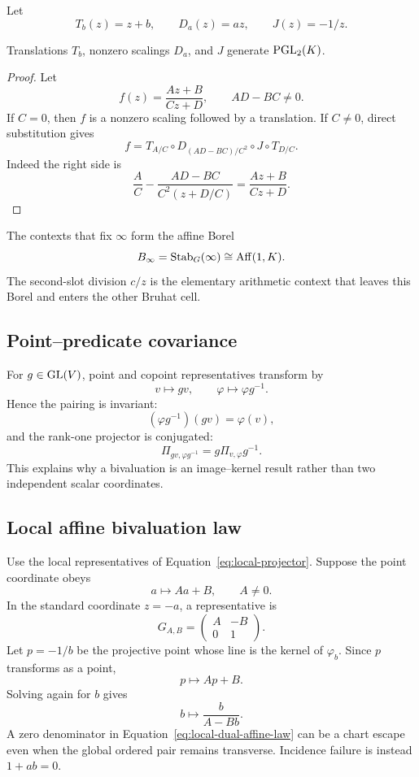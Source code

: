 Let
\[
  T_b(z)=z+b,
  \qquad D_a(z)=az,
  \qquad J(z)=-1/z.
\]

\begin{theorem}
\label{thm:appendix-pgl-generation}
Translations $T_b$, nonzero scalings $D_a$, and $J$ generate
$\operatorname{PGL}_2(K)$.
\end{theorem}

\begin{proof}
Let
\[
  f(z)=\frac{Az+B}{Cz+D},
  \qquad AD-BC\ne0.
\]
If $C=0$, then $f$ is a nonzero scaling followed by a translation.  If
$C\ne0$, direct substitution gives
\begin{equation}
 f
 =T_{A/C}\circ
 D_{(AD-BC)/C^2}\circ
 J\circ T_{D/C}.
 \label{eq:mobius-factorization-appendix}
\end{equation}
Indeed the right side is
\[
  \frac AC-\frac{AD-BC}{C^2(z+D/C)}
  =\frac{Az+B}{Cz+D}.
\]
\end{proof}

The contexts that fix $\infty$ form the affine Borel
\[
  B_\infty=\operatorname{Stab}_G(\infty)
  \cong\operatorname{Aff}(1,K).
\]
The second-slot division $c/z$ is the elementary arithmetic context that leaves
this Borel and enters the other Bruhat cell.

\subsection{Point--predicate covariance}

For $g\in\operatorname{GL}(V)$, point and copoint representatives transform by
\[
  v\longmapsto gv,
  \qquad
  \varphi\longmapsto\varphi g^{-1}.
\]
Hence the pairing is invariant:
\[
  (\varphi g^{-1})(gv)=\varphi(v),
\]
and the rank-one projector is conjugated:
\begin{equation}
  \Pi_{gv,\varphi g^{-1}}
  =g\Pi_{v,\varphi}g^{-1}.
  \label{eq:projector-covariance}
\end{equation}
This explains why a bivaluation is an image--kernel result rather than two
independent scalar coordinates.

\subsection{Local affine bivaluation law}

Use the local representatives of Equation~\eqref{eq:local-projector}.  Suppose
the point coordinate obeys
\[
  a\longmapsto Aa+B,
  \qquad A\ne0.
\]
In the standard coordinate $z=-a$, a representative is
\[
  G_{A,B}=\begin{pmatrix}A&-B\\0&1\end{pmatrix}.
\]
Let $p=-1/b$ be the projective point whose line is the kernel of
$\varphi_b$.  Since $p$ transforms as a point,
\[
  p\longmapsto Ap+B.
\]
Solving again for $b$ gives
\begin{equation}
  b\longmapsto\frac{b}{A-Bb}.
  \label{eq:local-dual-affine-law}
\end{equation}
A zero denominator in Equation~\eqref{eq:local-dual-affine-law} can be a chart
escape even when the global ordered pair remains transverse.  Incidence
failure is instead $1+ab=0$.

